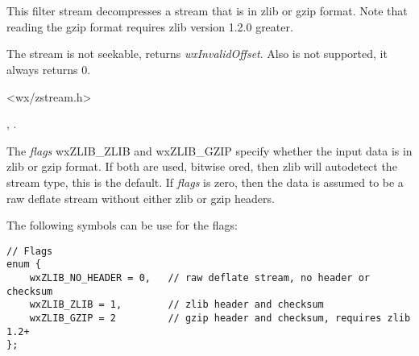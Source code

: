 \section{}\label{wxzlibinputstream}

This filter stream decompresses a stream that is in zlib or gzip format.
Note that reading the gzip format requires zlib version 1.2.0 greater.

The stream is not seekable,  returns
 {\it wxInvalidOffset}. Also  is
not supported, it always returns $0$.




<wx/zstream.h>


, 
 .




The {\it flags} wxZLIB\_ZLIB and wxZLIB\_GZIP specify whether the input data
is in zlib or gzip format. If both are used, bitwise ored, then zlib will
autodetect the stream type, this is the default.
If {\it flags} is zero, then the data is assumed to be a raw deflate stream
without either zlib or gzip headers.

The following symbols can be use for the flags:

\begin{verbatim}
// Flags
enum {
    wxZLIB_NO_HEADER = 0,   // raw deflate stream, no header or checksum
    wxZLIB_ZLIB = 1,        // zlib header and checksum
    wxZLIB_GZIP = 2         // gzip header and checksum, requires zlib 1.2+
};
\end{verbatim}


